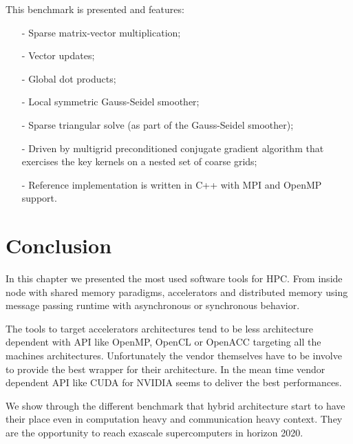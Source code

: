 This benchmark is presented and features:
\begin{itemize}[noitemsep,nolistsep]
\item[-] Sparse matrix-vector multiplication;
\item[-] Vector updates;
\item[-] Global dot products;
\item[-] Local symmetric Gauss-Seidel smoother;
\item[-] Sparse triangular solve (as part of the Gauss-Seidel smoother);
\item[-] Driven by multigrid preconditioned conjugate gradient algorithm that exercises the key kernels on a nested set of coarse grids;
\item[-] Reference implementation is written in C++ with MPI and OpenMP support.
\end{itemize}

\section{Conclusion}
In this chapter we presented the most used software tools for HPC. 
From inside node with shared memory paradigms, accelerators and distributed memory using message passing runtime with asynchronous or synchronous behavior. 

The tools to target accelerators architectures tend to be less architecture dependent with API like OpenMP, OpenCL or OpenACC targeting all the machines architectures. 
Unfortunately the vendor themselves have to be involve to provide the best wrapper for their architecture. 
In the mean time vendor dependent API like CUDA for NVIDIA seems to deliver the best performances.

We show through the different benchmark that hybrid architecture start to have their place even in computation heavy and communication heavy context. 
They are the opportunity to reach exascale supercomputers in horizon 2020.  

